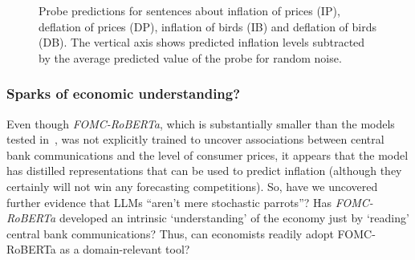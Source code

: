 \documentclass{article}
\theoremstyle{plain}
\theoremstyle{definition}
\theoremstyle{remark}
\begin{document}
\begin{figure}


\caption{\label{fig-attack}Probe predictions for sentences about inflation of prices (IP), deflation of prices (DP), inflation of birds (IB) and deflation of birds (DB). The vertical axis shows predicted inflation levels subtracted by the average predicted value of the probe for random noise.}

\end{figure}%

\subsubsection{Sparks of economic understanding?}\label{stochastic-parrots-after-all}
Even though \emph{FOMC-RoBERTa}, which is substantially smaller than the models tested in~\citet{gurnee2023languagev2}, was not explicitly trained to uncover associations between central bank communications and the level of consumer prices, it appears that the model has distilled representations that can be used to predict inflation (although they certainly will not win any forecasting competitions). So, have we uncovered further evidence that LLMs ``aren't mere stochastic
parrots''? Has \emph{FOMC-RoBERTa} developed an intrinsic `understanding'
of the economy just by `reading' central bank communications? Thus, can economists readily adopt FOMC-RoBERTa as a domain-relevant tool?


\end{document}

